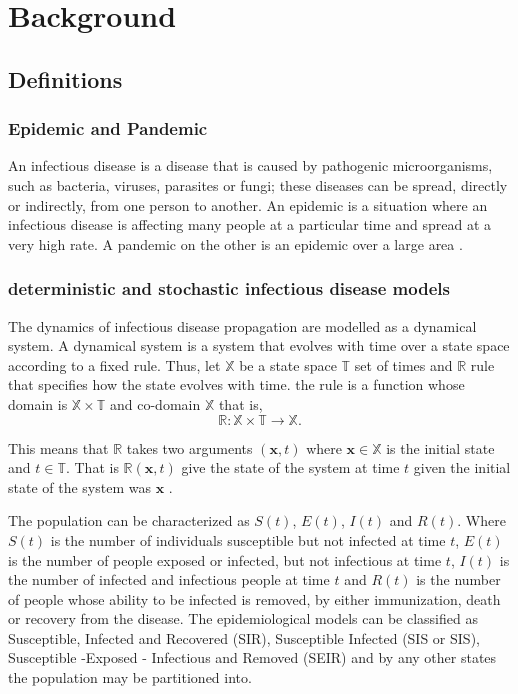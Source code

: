 \chapter{Background}

\section{Definitions}
\subsection{Epidemic and Pandemic }
An infectious disease is a disease that is caused by pathogenic microorganisms, such as bacteria, viruses, parasites or fungi; these diseases can be spread, directly or indirectly, from one person to another. An epidemic is a situation where an infectious disease is affecting many people at a particular time and spread at a very high rate. A pandemic on the other
is an epidemic over a large area \citep{morens2009pandemic}.

\subsection{deterministic and stochastic infectious disease models}
The dynamics of infectious disease propagation are modelled as a dynamical system. A dynamical system is a system that evolves with time over a state space according to a fixed rule. Thus, let $\mathbb{X}$ be a state space $\mathbb{T}$ set of times and $\mathbb{R}$ rule that specifies how the state evolves with time. the rule is a function  whose domain is $\mathbb{X} \times  \mathbb{T}$ and co-domain $\mathbb{X}$ that is,
\begin{equation*}
\mathbb{R}: \mathbb{X}  \times \mathbb{T} \longrightarrow \mathbb{X}.
\end{equation*}

This means that $\mathbb{R}$ takes two arguments $( \textbf{x},t)$ where $\textbf{x} \in \mathbb{X}$ is the initial state and $t \in \mathbb{T}$. That is $\mathbb{R} ( \textbf{x},t)$ give
the state of the system at time  $t$ given the initial state of the system was $\textbf{x}$ \citep{DQ}.

The population can be characterized as $S (t) $, $E (t) $, $I (t) $ and $R (t) $. Where $S (t) $ is the number of individuals susceptible but not infected at time $t$, $E (t) $ is the number of people exposed or infected, but not infectious at time $t$, $I (t) $ is the number of infected and infectious people at time $t$ and $R (t) $ is the number of people whose ability to be infected is removed, by either immunization, death or recovery from the disease. The epidemiological models can be classified as Susceptible, Infected and Recovered (SIR), Susceptible Infected (SIS or SIS), Susceptible -Exposed - Infectious and Removed (SEIR)
and by any other states the population may be partitioned into.

